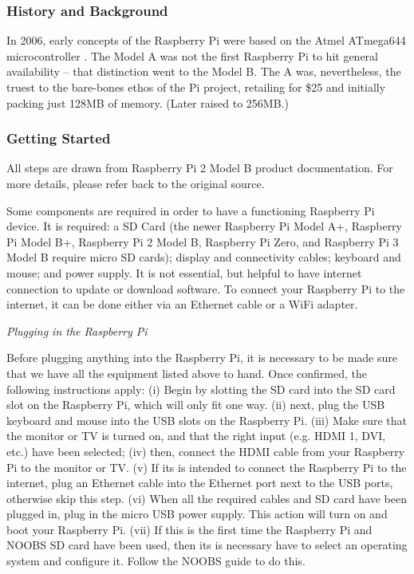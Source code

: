 \subsubsection{History and Background}

In 2006, early concepts of the Raspberry Pi were based on the Atmel ATmega644 microcontroller \cite{wong2011build}.
The Model A was not the first Raspberry Pi to hit general availability – that distinction went to the Model B. 
The A was, nevertheless, the truest to the bare-bones ethos of the Pi project, retailing for \$25 and initially packing just 128MB of memory. (Later raised to 256MB.)

\subsubsection{Getting Started}

All steps are drawn from \cite{resp2} Raspberry Pi 2 Model B product documentation.
For more details, please refer back to the original source.

Some components are required in order to have a functioning Raspberry Pi device.
It is required: a SD Card (the newer Raspberry Pi Model A+, Raspberry Pi Model B+, Raspberry Pi 2 Model B, Raspberry Pi Zero, and Raspberry Pi 3 Model B require micro SD cards); display and connectivity cables; keyboard and mouse; and power supply.
It is not essential, but helpful to have internet connection to update or download software.
To connect your Raspberry Pi to the internet, it can be done either via an Ethernet cable or a WiFi adapter.
  

\emph{Plugging in the Raspberry Pi}

Before plugging anything into the Raspberry Pi, it is necessary to be made sure that we have all the equipment listed above to hand. 
Once confirmed, the following instructions apply:
(i) Begin by slotting the SD card into the SD card slot on the Raspberry Pi, which will only fit one way.
(ii) next, plug the USB keyboard and mouse into the USB slots on the Raspberry Pi.
(iii) Make sure that the monitor or TV is turned on, and that the  right input (e.g. HDMI 1, DVI, etc.) have been selected;
(iv) then, connect the HDMI cable from your Raspberry Pi to the monitor or TV.
(v) If its is intended to connect the Raspberry Pi to the internet, plug an Ethernet cable into the Ethernet port next to the USB ports, otherwise skip this step.
(vi) When all the required cables and SD card have been plugged in, plug in the micro USB power supply. This action will turn on and boot your Raspberry Pi.
(vii) If this is the first time the Raspberry Pi and NOOBS SD card have been used, then its is necessary have to select an operating system and configure it. Follow the NOOBS guide to do this.

